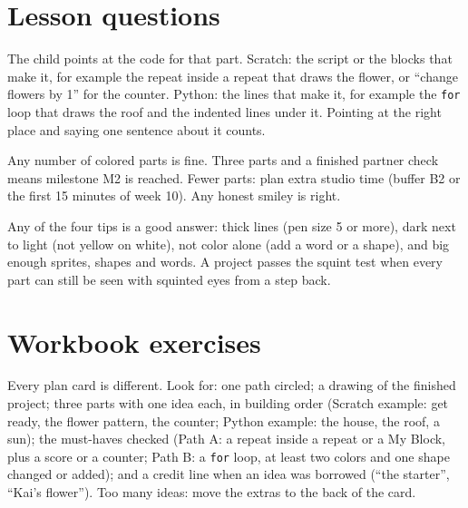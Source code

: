 
\section{Lesson questions}
\begin{answer}
The child points at the code for that part. Scratch: the script or the blocks that make it, for example the repeat inside a repeat that draws the flower, or \enquote{change flowers by 1} for the counter. Python: the lines that make it, for example the \texttt{for} loop that draws the roof and the indented lines under it. Pointing at the right place and saying one sentence about it counts.
\end{answer}

\begin{answer}[Reflection]
Any number of colored parts is fine. Three parts and a finished partner check means milestone M2 is reached. Fewer parts: plan extra studio time (buffer B2 or the first 15 minutes of week 10). Any honest smiley is right.
\end{answer}

\begin{answer}
Any of the four tips is a good answer: thick lines (pen size 5 or more), dark next to light (not yellow on white), not color alone (add a word or a shape), and big enough sprites, shapes and words. A project passes the squint test when every part can still be seen with squinted eyes from a step back.
\end{answer}

\section{Workbook exercises}
\begin{answer}
Every plan card is different. Look for: one path circled; a drawing of the finished project; three parts with one idea each, in building order (Scratch example: get ready, the flower pattern, the counter; Python example: the house, the roof, a sun); the must-haves checked (Path A: a repeat inside a repeat or a My Block, plus a score or a counter; Path B: a \texttt{for} loop, at least two colors and one shape changed or added); and a credit line when an idea was borrowed (\enquote{the starter}, \enquote{Kai's flower}). Too many ideas: move the extras to the back of the card.
\end{answer}


